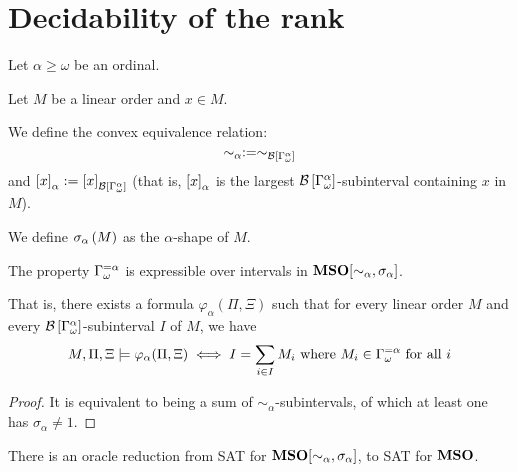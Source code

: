 \section{Decidability of the rank}

\begin{definition}
  Let $\alpha \ge \omega$ be an ordinal.

  Let $M$ be a linear order and $x \in M$.

  We define the convex equivalence relation:
  \[\sim_\alpha := \sim_{\mathcal{B} \left[ {{\Gamma_{\omega}^{\alpha}}} \right]}\]
  and $\left[ {x} \right]_{\alpha} := \left[ {x} \right]_{\mathcal{B} \left[ {{\Gamma_{\omega}^{\alpha}}} \right]}$ (that is,
  $\left[ {x} \right]_{\alpha}$ is the largest $\mathcal{B} \left[ {{\Gamma_{\omega}^{\alpha}}} \right]$-subinterval
  containing $x$ in $M$).

  We define $\sigma_{\alpha} \left( {M} \right)$ as
  the $\alpha$-shape of $M$.
\end{definition}

\begin{lemma}
  The property
  $\Gamma_{\omega}^{= \alpha}$ is expressible over intervals
  in $\mathbf{MSO}[\sim_{\alpha}, \sigma_{\alpha}]$.

  That is, there exists a formula $\varphi_{\alpha}(\Pi, \Xi)$
  such that for every linear order $M$ and every $\mathcal{B} \left[ {{\Gamma_{\omega}^{\alpha}}} \right]$-subinterval
  $I$ of $M$, we have
  \[
    M, \Pi, \Xi \models \varphi_{\alpha}(\Pi, \Xi) \iff
    I = \sum_{i \in I} M_i
    \text{ where } M_i \in \Gamma_{\omega}^{= \alpha} \text{ for all } i
  \]
\end{lemma}

\begin{proof}
  It is equivalent to being a sum of $\sim_{\alpha}$-subintervals,
  of which at least one has $\sigma_{\alpha} \ne 1$.
\end{proof}

\begin{theorem}
  There is an oracle reduction from SAT for $\mathbf{MSO}[\sim_{\alpha}, \sigma_{\alpha}]$,
  to SAT for $\mathbf{MSO}$.
\end{theorem}

